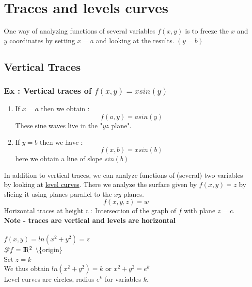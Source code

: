 \documentclass[12pt, letterpaper, twoside]{article}
\newcommand{\real}{\rm I\!R}
\newcommand{\domain}{\mathscr{D}}
\begin{document}
\section*{Traces and levels curves}
One way of analyzing functions of several variables $f(x,y)$ is to freeze the $x$ and $y$ coordinates by setting $x=a$ and looking at the results. $(y=b)$

\subsection*{Vertical Traces}
\subsubsection*{Ex : Vertical traces of $f(x,y) = xsin(y)$}
\begin{enumerate}
	\item If $x=a$ then we obtain : 
		$$f(a,y) = asin(y)$$
		These sine waves live in the "$yz$ plane".
	\item If $y=b$ then we have :
		$$f(x,b) = xsin(b)$$
		here we obtain a line of slope $sin(b)$	
\end{enumerate}
In addition to vertical traces, we can analyze functions of (several) two variables by looking at \underline{level curves}. There we analyze the surface given by $f(x,y)=z$ by slicing it using planes parallel to the $xy$-planes.
$$f(x,y,z)=w$$
Horizontal traces at height c : Intersection of the graph of $f$ with plane $z=c$.\\
\textbf{Note - traces are vertical and levels are horizontal}\\
\\
$f(x,y)=ln(x^2+y^2)=z$\\
$\domain f = \real^2$ \textbackslash \{origin\}\\
Set $z=k$\\
We thus obtain $ln(x^2+y^2)=k$ or $x^2+y^2=e^k$\\
Level curves are circles, radius $e^k$ for variables $k$.
\end{document}
